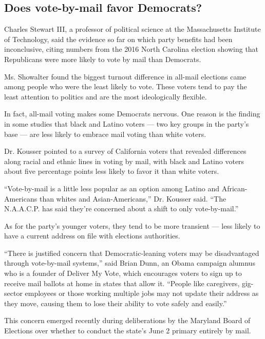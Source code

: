 \hypertarget{does-vote-by-mail-favor-democrats}{%
\subsection{Does vote-by-mail favor
Democrats?}\label{does-vote-by-mail-favor-democrats}}

Charles Stewart III, a professor of political science at the
Massachusetts Institute of Technology, said the evidence so far on which
party benefits had been inconclusive, citing numbers from the 2016 North
Carolina election showing that Republicans were more likely to vote by
mail than Democrats.

Ms. Showalter found the biggest turnout difference in all-mail elections
came among people who were the least likely to vote. These voters tend
to pay the least attention to politics and are the most ideologically
flexible.

In fact, all-mail voting makes some Democrats nervous. One reason is the
finding in some studies that black and Latino voters --- two key groups
in the party's base --- are less likely to embrace mail voting than
white voters.

Dr. Kousser pointed to a survey of California voters that revealed
differences along racial and ethnic lines in voting by mail, with black
and Latino voters about five percentage points less likely to favor it
than white voters.

``Vote-by-mail is a little less popular as an option among Latino and
African-Americans than whites and Asian-Americans,'' Dr. Kousser said.
``The N.A.A.C.P. has said they're concerned about a shift to only
vote-by-mail.''

As for the party's younger voters, they tend to be more transient ---
less likely to have a current address on file with elections
authorities.

``There is justified concern that Democratic-leaning voters may be
disadvantaged through vote-by-mail systems,'' said Brian Dunn, an Obama
campaign alumnus who is a founder of Deliver My Vote, which encourages
voters to sign up to receive mail ballots at home in states that allow
it. ``People like caregivers, gig-sector employees or those working
multiple jobs may not update their address as they move, causing them to
lose their ability to vote safely and easily.''

This concern emerged recently during deliberations by the Maryland Board
of Elections over whether to conduct the state's June 2 primary entirely
by mail.

